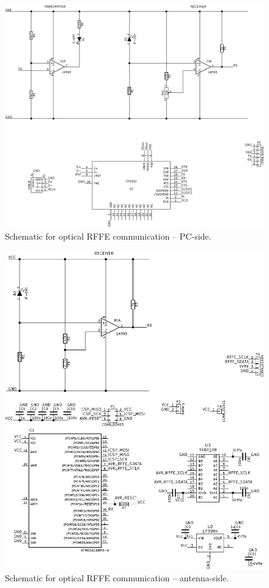 \begin{figure}[htbp]
    \centering
    \includegraphics[scale=0.85]{img/optical_rffe/schematic_pc}
    \caption{Schematic for optical RFFE communication -- PC-side.}
    \label{fig:rffe_schematic_pc}
\end{figure}

\begin{figure}[htbp]
    \centering
    \includegraphics[scale=0.85]{img/optical_rffe/schematic_ant}
    \caption{Schematic for optical RFFE communication -- antenna-side.}
    \label{fig:rffe_schematic_ant}
\end{figure}

